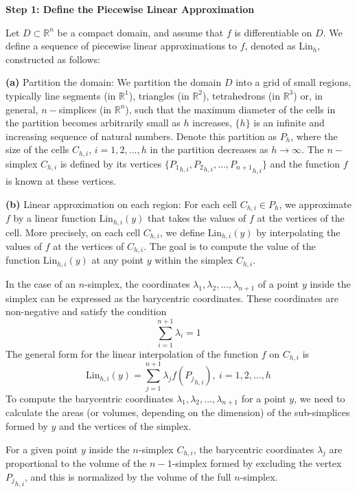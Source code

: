 \documentclass[preprint,12pt]{elsarticle}
\begin{document}
\medskip
{\bf Step 1: Define the Piecewise Linear Approximation}

Let \( D \subset \mathbb{R}^n \) be a compact domain, and assume that \( f \) is differentiable on \( D \). We define a sequence of piecewise linear approximations to \( f \), denoted as \( \text{Lin}_h \), constructed as follows:

\medskip
{\bf{(a)}} Partition the domain: We partition the domain \( D \) into a grid of small regions, typically line segments (in \( \mathbb{R}^1 \)), triangles (in \( \mathbb{R}^2 \)), tetrahedrons (in \( \mathbb{R}^3 \)) or, in general, $n-$simplices (in \( \mathbb{R}^n \)), such that the maximum diameter of the cells in the partition becomes arbitrarily small as \( h \) increases, $\{h \}$ is an infinite and increasing sequence of natural numbers. Denote this partition as \( P_h \), where the size of the cells $C_{h,i}$, $i=1,2,\dots,h$ in the partition decreases as \( h \to \infty \). The $n-$simplex $C_{h,i}$ is defined by its vertices \( \{ {P_1}_{h,i}, {P_2}_{h,i}, \dots, {P_{n+1}}_{h,i} \} \) and the function \( f \) is known at these vertices.

\medskip
{\bf{(b)}} Linear approximation on each region: For each cell \( C_{h,i} \in P_h \), we approximate \( f \) by a linear function \( \text{Lin}_{h,i}(y) \) that takes the values of \( f \) at the vertices of the cell. More precisely, on each cell \( C_{h,i} \), we define \( \text{Lin}_{h,i}(y) \) by interpolating the values of \( f \) at the vertices of $C_{h,i}$.
The goal is to compute the value of the function \( \text{Lin}_{h,i}(y) \) at any point \( y \) within the simplex $C_{h,i}$.

In the case of an \( n \)-simplex, the coordinates \( \lambda_1, \lambda_2, \dots, \lambda_{n+1} \) of a point \( y \) inside the simplex can be expressed as the barycentric coordinates. These coordinates are non-negative and satisfy the condition
\[
\sum_{i=1}^{n+1} \lambda_i = 1
\]
The general form for the linear interpolation of the function \( f \) on $C_{h,i}$ is
\[
\text{Lin}_{h,i}(y) = \sum_{j=1}^{n+1} \lambda_j f({P_j}_{h,i}), \ i=1,2,\dots,h
\]
To compute the barycentric coordinates \( \lambda_1, \lambda_2, \dots, \lambda_{n+1} \) for a point \( y \), we need to calculate the areas (or volumes, depending on the dimension) of the sub-simplices formed by \( y \) and the vertices of the simplex.

For a given point \( y \) inside the \( n \)-simplex \( C_{h,i} \), the barycentric coordinates \( \lambda_j \) are proportional to the volume of the \( n-1 \)-simplex formed by excluding the vertex \( {P_j}_{h,i} \), and this is normalized by the volume of the full \( n \)-simplex.
\end{document}
